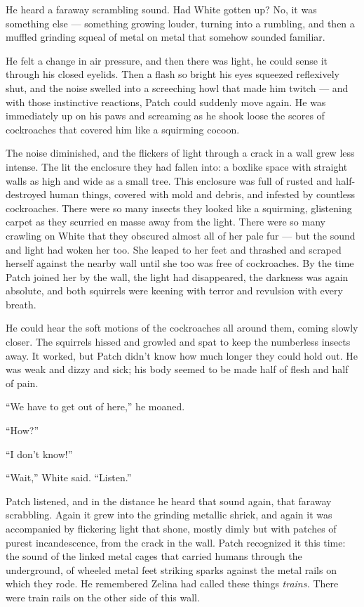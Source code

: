 \documentclass[ebook,oneside,openany,17pt]{memoir}
\newenvironment{tolerant}[1]{%
  \par\tolerance=#1\relax
}{%
  \par
}
\begin{document}
He heard a faraway scrambling sound. Had White gotten up? No, it was
something else — something growing louder, turning into a rumbling,
and then a muffled grinding squeal of metal on metal that somehow
sounded familiar.

He felt a change in air pressure, and then there was light, he could
sense it through his closed eyelids. Then a flash so bright his eyes
squeezed reflexively shut, and the noise swelled into a screeching
howl that made him twitch — and with those instinctive reactions,
Patch could suddenly move again. He was immediately up on his paws and
screaming as he shook loose the scores of cockroaches that covered him
like a squirming cocoon.

\begin{tolerant}{1000}
The noise diminished, and the flickers of light through a crack in a
wall grew less intense. The lit the enclosure they had fallen into: a
boxlike space with straight walls as high and wide as a small
tree. This enclosure was full of rusted and half-destroyed human
things, covered with mold and debris, and infested by countless
cockroaches. There were so many insects they looked like a squirming,
glistening carpet as they scurried en masse away from the light. There
were so many crawling on White that they obscured almost all of her
pale fur — but the sound and light had woken her too. She leaped to
her feet and thrashed and scraped herself against the nearby wall
until she too was free of cockroaches. By the time Patch joined her by
the wall, the light had disappeared, the darkness was again absolute,
and both squirrels were keening with terror and revulsion with every
breath.
\end{tolerant}

\begin{tolerant}{1000}
He could hear the soft motions of the cockroaches all around them,
coming slowly closer. The squirrels hissed and growled and spat to
keep the numberless insects away. It worked, but Patch didn’t know how
much longer they could hold out. He was weak and dizzy and sick; his
body seemed to be made half of flesh and half of pain.
\end{tolerant}

“We have to get out of here,” he moaned.

“How?”

“I don’t know!”

“Wait,” White said. “Listen.”

\begin{tolerant}{1000}
Patch listened, and in the distance he heard that sound again, that
faraway scrabbling. Again it grew into the grinding metallic shriek,
and again it was accompanied by flickering light that shone, mostly
dimly but with patches of purest incandescence, from the crack in the
wall. Patch recognized it this time: the sound of the linked metal
cages that carried humans through the underground, of wheeled metal
feet striking sparks against the metal rails on which they rode. He
remembered Zelina had called these things \emph{trains.} There were
train rails on the other side of this wall.
\end{tolerant}
\end{document}
